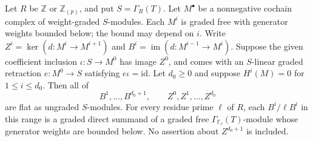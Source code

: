 \begin{proposition}
\label{AL15}
Let $R$ be $\mathbb Z$ or $\mathbb Z_{(p)}$, and put
$S=\Gamma_R(T)$. Let $M^\bullet$ be a nonnegative
cochain complex of weight-graded $S$-modules. Each $M^i$
is graded free with generator weights bounded below;
the bound may depend on $i$. Write
$Z^i=\ker(d:M^i\to M^{i+1})$ and
$B^i=\operatorname{im}(d:M^{i-1}\to M^i)$.
Suppose the given coefficient inclusion
$\iota:S\to M^0$ has image $Z^0$, and comes with an
$S$-linear graded retraction $e:M^0\to S$ satisfying
$e\iota=\mathrm{id}$. Let $d_0\geq0$ and suppose
$H^i(M)=0$ for $1\leq i\leq d_0$.
Then all of
\[
 B^1,\ldots,B^{d_0+1},\qquad
 Z^0,Z^1,\ldots,Z^{d_0}
 \tag{AL.80}
\]
are flat as ungraded $S$-modules. For every residue
prime $\ell$ of $R$, each $B^i/\ell B^i$ in this
range is a graded direct summand of a graded free
$\Gamma_{\mathbb F_\ell}(T)$-module whose generator
weights are bounded below. No assertion about
$Z^{d_0+1}$ is included.
\end{proposition}

